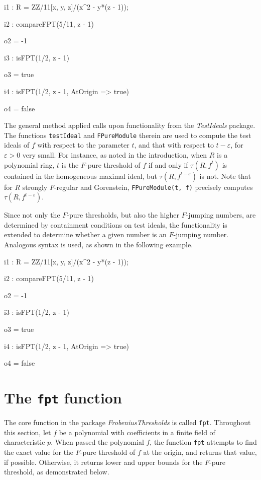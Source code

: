 \documentclass{amsart}
\begin{document}
\bigskip
{\small
{}
\begin{MyVerbatim}
i1 : R = ZZ/11[x, y, z]/(x^2 - y*(z - 1));

i2 : compareFPT(5/11, z - 1)

o2 = -1

i3 : isFPT(1/2, z - 1)

o3 = true

i4 : isFPT(1/2, z - 1, AtOrigin => true)

o4 = false
\end{MyVerbatim}
}
\bigskip

The general method applied calls upon functionality from the \emph{TestIdeals} package.  The functions \texttt{testIdeal} and \texttt{FPureModule} therein are used
to compute the test ideals of $f$ with respect to the parameter $t$, and that with respect to $t - \varepsilon$, for $\varepsilon>0$ very small. For instance, as noted in the introduction, when $R$ is a polynomial ring, $t$ is the $F$-pure threshold of $f$ if and only if $\tau(R, f^t)$ is contained in the homogeneous maximal ideal, but
$\tau(R, f^{t-\varepsilon})$ is not.
Note that for $R$ strongly $F$-regular and Gorenstein, \texttt{FPureModule(t, f)} precisely computes $\tau(R, f^{t-\varepsilon})$.


Since not only the $F$-pure thresholds, but also the higher $F$-jumping numbers, are determined by containment conditions on test ideals, the functionality is extended to determine whether a given number is an $F$-jumping number.
Analogous syntax is used, as shown in the following example.

\bigskip
{\small
{}
\begin{MyVerbatim}
i1 : R = ZZ/11[x, y, z]/(x^2 - y*(z - 1));

i2 : compareFPT(5/11, z - 1)

o2 = -1

i3 : isFPT(1/2, z - 1)

o3 = true

i4 : isFPT(1/2, z - 1, AtOrigin => true)

o4 = false
\end{MyVerbatim}
}
\bigskip

\section{The {\tt fpt} function}
\label{sec.FPT}

The core function in the package \emph{FrobeniusThresholds} is called \texttt{fpt}.  Throughout this section, let $f$ be a polynomial with coefficients in a finite field of characteristic $p$. When passed the polynomial $f$, the function \texttt{fpt} attempts to find the exact value for the $F$-pure threshold of $f$ at the origin, and returns that value, if possible.  Otherwise, it returns lower and upper bounds for the $F$-pure threshold, as demonstrated below.
\end{document}
